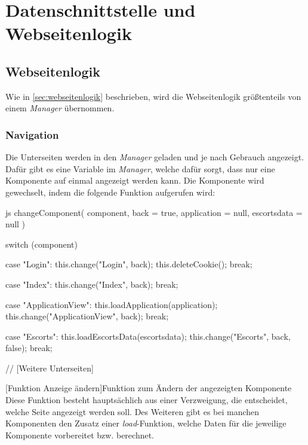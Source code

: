 \section{Datenschnittstelle und Webseitenlogik}
\label{chapter:implementierung-datenschnittstelle}
\subsection{Webseitenlogik}
Wie in \autoref{sec:webseitenlogik} beschrieben, wird die Webseitenlogik größtenteils von einem \textit{Manager} übernommen.

\subsubsection{Navigation}
\label{sec:navigation}
Die Unterseiten werden in den \textit{Manager} geladen und je nach Gebrauch angezeigt. Dafür gibt es eine Variable im \textit{Manager}, welche dafür sorgt, dass nur eine Komponente auf einmal angezeigt werden kann. Die Komponente wird gewechselt, indem die folgende Funktion aufgerufen wird:
\begin{code}{js}
	changeComponent(
	component,
	back = true,
	application = null,
	escortsdata = null
	) {
		switch (component) {
			case "Login":
			this.change("Login", back);
			this.deleteCookie();
			break;
			
			case "Index":
			this.change("Index", back);
			break;
			
			case "ApplicationView":
			this.loadApplication(application);
			this.change("ApplicationView", back);
			break;
			
			case "Escorts":
			this.loadEscortsData(escortsdata);
			this.change("Escorts", back, false);
			break;
			
			// [Weitere Unterseiten]
		}
	}
\end{code}
[Funktion Anzeige ändern]{Funktion zum Ändern der angezeigten Komponente}~\\
\newpage
Diese Funktion besteht hauptsächlich aus einer Verzweigung, die entscheidet, welche Seite angezeigt werden soll.
Des Weiteren gibt es bei manchen Komponenten den Zusatz einer \textit{load}-Funktion, welche Daten für die jeweilige Komponente vorbereitet bzw. berechnet.

